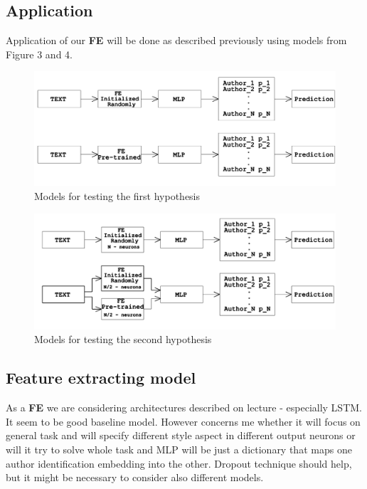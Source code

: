 \documentclass{article}
\begin{document}
\subsection{Application}
Application of our \textbf{FE} will be done as described previously using models from Figure 3 and 4.
\begin{figure}
  \centering
        \includegraphics[width=1.0\textwidth]{H1.png}
        \caption{Models for testing the first hypothesis}
\end{figure}

\begin{figure}
  \centering
        \includegraphics[width=1.0\textwidth]{H2.png}
        \caption{Models for testing the second hypothesis}
\end{figure}

\subsection{Feature extracting model}
As a \textbf{FE} we are considering architectures described on lecture - especially LSTM. It seem to be good baseline model. However concerns me whether it will focus on general task and will specify different style aspect in different output neurons or will it try to solve whole task and MLP will be just a dictionary that maps one author identification embedding into the other. Dropout technique should help, but it might be necessary to consider also different models.
\end{document}
